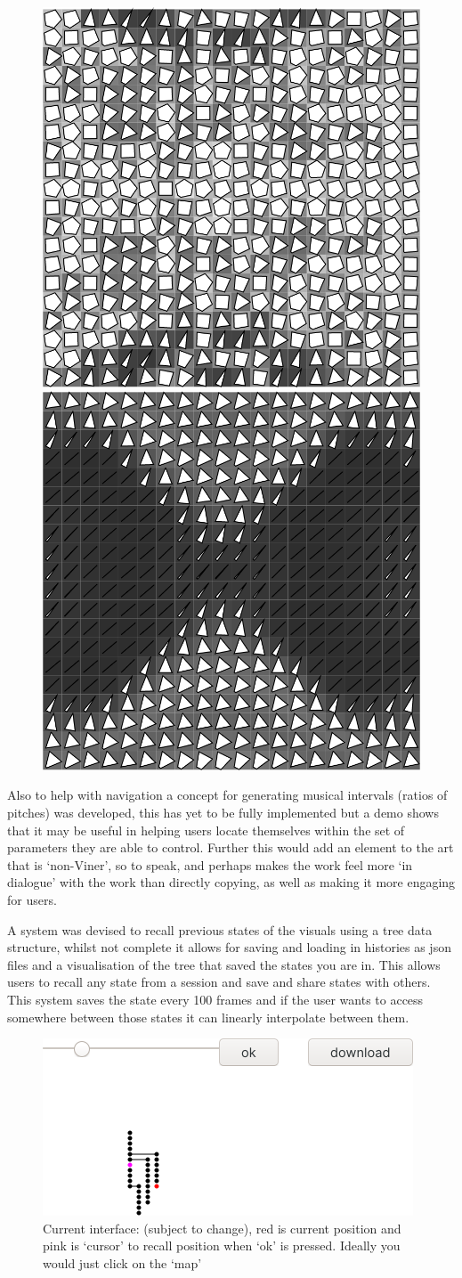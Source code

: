 \documentclass[10pt,a4paper]{article}
\begin{document}
\begin{figure}[H]
\centering
\includegraphics[width=.3\textwidth]{noisewithPolygons}
\hspace{0.2cm}
\includegraphics[width=.3\textwidth]{noisewithPolygons1term}
\end{figure}

Also to help with navigation a concept for generating musical intervals (ratios
of pitches) was developed, this has yet to be fully implemented but a demo shows
that it may be useful in helping users locate themselves within the set of
parameters they are able to control. Further this would add an element to the
art that is `non-Viner', so to speak, and perhaps makes the work feel more `in
dialogue' with the work than directly copying, as well as making it more
engaging for users.

A system was devised to recall previous states of the visuals using a tree data
structure, whilst not complete it allows for saving and loading in histories as
json files and a visualisation of the tree that saved the states you are in.
This allows users to recall any state from a session and save and share states
with others. This system saves the state every 100 frames and if the user wants
to access somewhere between those states it can linearly interpolate between
them.

\begin{figure}[H]
\centering
\includegraphics[width=.7\textwidth]{tree}
\caption{Current interface: (subject to change), red is current position and pink
is `cursor' to recall position when `ok' is pressed. Ideally you would just
click on the `map'}
\end{figure}
\end{document}
